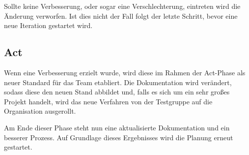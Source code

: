             Sollte keine Verbesserung, oder sogar eine Verschlechterung, eintreten wird die Änderung verworfen. Ist dies nicht der Fall folgt der letzte Schritt, bevor eine neue Iteration gestartet wird.

        \subsection{Act}

            Wenn eine Verbesserung erzielt wurde, wird diese im Rahmen der Act-Phase als neuer Standard für das Team etabliert. Die Dokumentation wird verändert, sodass diese den neuen Stand abbildet und, falls es sich um ein sehr großes Projekt handelt, wird das neue Verfahren von der Testgruppe auf die Organisation ausgerollt.

            Am Ende dieser Phase steht nun eine aktualisierte Dokumentation und ein besserer Prozess. Auf Grundlage dieses Ergebnisses wird die Planung erneut gestartet. 